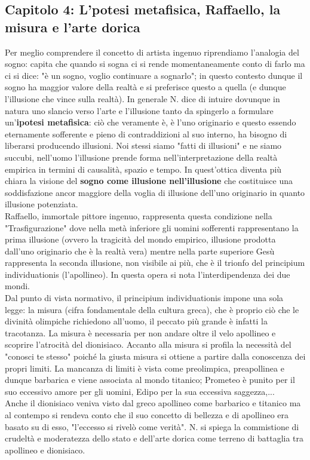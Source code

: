 \documentclass[10pt,a4paper]{article}
\begin{document}
\subsection{Capitolo 4: L'potesi metafisica, Raffaello, la misura e l'arte dorica}
Per meglio comprendere il concetto di artista ingenuo riprendiamo l'analogia del sogno: capita che quando si sogna ci si rende momentaneamente conto di farlo ma ci si dice: "è un sogno, voglio continuare a sognarlo"; in questo contesto dunque il sogno ha maggior valore della realtà e si preferisce questo a quella (e dunque l'illusione che vince sulla realtà). In generale N. dice di intuire dovunque in natura uno slancio verso l'arte e l'illusione tanto da spingerlo a formulare un'\textbf{ipotesi metafisica}: ciò che veramente è, è l'uno originario e questo essendo eternamente sofferente e pieno di contraddizioni al suo interno, ha bisogno di liberarsi producendo illusioni. Noi stessi siamo "fatti di illusioni" e ne siamo succubi, nell'uomo l'illusione prende forma nell'interpretazione della realtà empirica in termini di causalità, spazio e tempo. In quest'ottica diventa più chiara la visione del \textbf{sogno come illusione nell'illusione} che costituisce una soddisfazione ancor maggiore della voglia di illusione dell'uno originario in quanto illusione potenziata.\\
Raffaello, immortale pittore ingenuo, rappresenta questa condizione nella "Trasfigurazione" dove nella metà inferiore gli uomini sofferenti rappresentano la prima illusione (ovvero la tragicità del mondo empirico, illusione prodotta dall'uno originario che è la realtà vera) mentre nella parte superiore Gesù rappresenta la seconda illusione, non visibile ai più, che è il trionfo del principium individuationis (l'apollineo). In questa opera si nota l'interdipendenza dei due mondi.\\
Dal punto di vista normativo, il principium individuationis impone una sola legge: la misura (cifra fondamentale della cultura greca), che è proprio ciò che le divinità olimpiche richiedono all'uomo, il peccato più grande è infatti la tracotanza. La misura è necessaria per non andare oltre il velo apollineo e scoprire l'atrocità del dionisiaco. Accanto alla misura si profila la necessità del "conosci te stesso" poiché la giusta misura si ottiene a partire dalla conoscenza dei propri limiti. La mancanza di limiti è vista come preolimpica, preapollinea e dunque barbarica e viene associata al mondo titanico; Prometeo è punito per il suo eccessivo amore per gli uomini, Edipo per la sua eccessiva saggezza,...\\
Anche il dionisiaco veniva visto dal greco apollineo come barbarico e titanico ma al contempo si rendeva conto che il suo concetto di bellezza e di apollineo era basato su di esso, "l'eccesso si rivelò come verità". N. si spiega la commistione di crudeltà e moderatezza dello stato e dell'arte dorica come terreno di battaglia tra apollineo e dionisiaco.   
\end{document}
